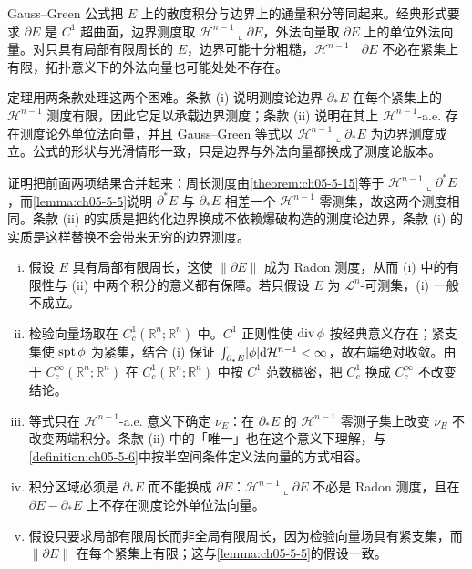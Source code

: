 \documentclass[../../main.tex]{subfiles}%
\begin{document}
\begin{remark}\label{remark:ch05-thm-5-16-动机}
Gauss--Green 公式把 $E$ 上的散度积分与边界上的通量积分等同起来。经典形式要求 $\partial E$ 是 $C^1$ 超曲面，边界测度取 $\mathcal{H}^{n-1}\llcorner\partial E$，外法向量取 $\partial E$ 上的单位外法向量。对只具有局部有限周长的 $E$，边界可能十分粗糙，$\mathcal{H}^{n-1}\llcorner\partial E$ 不必在紧集上有限，拓扑意义下的外法向量也可能处处不存在。

定理用两条款处理这两个困难。条款 (i) 说明测度论边界 $\partial_*E$ 在每个紧集上的 $\mathcal{H}^{n-1}$ 测度有限，因此它足以承载边界测度；条款 (ii) 说明在其上 $\mathcal{H}^{n-1}$-a.e. 存在测度论外单位法向量，并且 Gauss--Green 等式以 $\mathcal{H}^{n-1}\llcorner\partial_*E$ 为边界测度成立。公式的形状与光滑情形一致，只是边界与外法向量都换成了测度论版本。

证明把前面两项结果合并起来：周长测度由\cref{theorem:ch05-5-15}等于 $\mathcal{H}^{n-1}\llcorner\partial^*E$，而\cref{lemma:ch05-5-5}说明 $\partial^*E$ 与 $\partial_*E$ 相差一个 $\mathcal{H}^{n-1}$ 零测集，故这两个测度相同。条款 (ii) 的实质是把约化边界换成不依赖爆破构造的测度论边界，条款 (i) 的实质是这样替换不会带来无穷的边界测度。%
\end{remark}

\begin{remark}\label{remark:ch05-thm-5-16-条件}
\begin{enumerate}[(i)]
\item 假设 $E$ 具有局部有限周长，这使 $\lVert\partial E\rVert$ 成为 Radon 测度，从而 (i) 中的有限性与 (ii) 中两个积分的意义都有保障。若只假设 $E$ 为 $\mathcal{L}^n$-可测集，(i) 一般不成立。
\item 检验向量场取在 $C_c^1(\mathbb{R}^n;\mathbb{R}^n)$ 中。$C^1$ 正则性使 $\operatorname{div}\phi$ 按经典意义存在；紧支集使 $\operatorname{spt}\phi$ 为紧集，结合 (i) 保证 $\int_{\partial_*E}\lvert\phi\rvert\mathrm{d}\mathcal{H}^{n-1}<\infty$，故右端绝对收敛。由于 $C_c^{\infty}(\mathbb{R}^n;\mathbb{R}^n)$ 在 $C_c^1(\mathbb{R}^n;\mathbb{R}^n)$ 中按 $C^1$ 范数稠密，把 $C_c^1$ 换成 $C_c^{\infty}$ 不改变结论。
\item 等式只在 $\mathcal{H}^{n-1}$-a.e. 意义下确定 $\nu_E$：在 $\partial_*E$ 的 $\mathcal{H}^{n-1}$ 零测子集上改变 $\nu_E$ 不改变两端积分。条款 (ii) 中的「唯一」也在这个意义下理解，与\cref{definition:ch05-5-6}中按半空间条件定义法向量的方式相容。%
\item 积分区域必须是 $\partial_*E$ 而不能换成 $\partial E$：$\mathcal{H}^{n-1}\llcorner\partial E$ 不必是 Radon 测度，且在 $\partial E-\partial_*E$ 上不存在测度论外单位法向量。
\item 假设只要求局部有限周长而非全局有限周长，因为检验向量场具有紧支集，而 $\lVert\partial E\rVert$ 在每个紧集上有限；这与\cref{lemma:ch05-5-5}的假设一致。%
\end{enumerate}
\end{remark}
\end{document}
